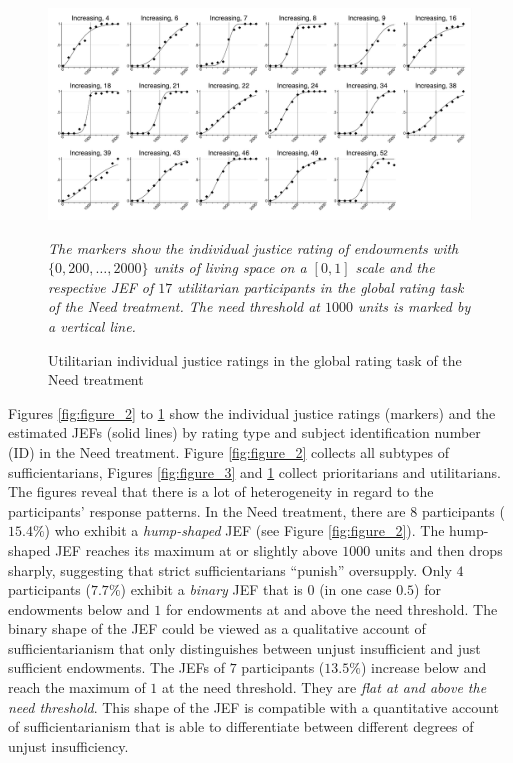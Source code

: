 \documentclass[12pt]{scrartcl}
\begin{document}
\begin{figure}[h!t!]
   \centering
   \includegraphics[width=\linewidth]{figures/figure_4.pdf}
   \begin{minipage}{\linewidth}
      \footnotesize
      \textit{The markers show the individual justice rating of endowments with $\{0,200,\ldots,2000\}$ units of living space on a $[0,1]$ scale and the respective JEF of $17$ utilitarian participants in the global rating task of the Need treatment. The need threshold at $1000$ units is marked by a vertical line.}
   \end{minipage}
   \caption{Utilitarian individual justice ratings in the global rating task of the Need treatment}\label{fig:figure_4}
\end{figure}

Figures \ref{fig:figure_2} to \ref{fig:figure_4} show the individual justice ratings (markers) and the estimated JEFs (solid lines) by rating type and subject identification number (ID) in the Need treatment.
Figure \ref{fig:figure_2} collects all subtypes of sufficientarians, Figures \ref{fig:figure_3} and \ref{fig:figure_4} collect prioritarians and utilitarians.
The figures reveal that there is a lot of heterogeneity in regard to the participants' response patterns.
In the Need treatment, there are $8$ participants ($15.4\%$) who exhibit a \textit{hump-shaped} JEF (see Figure \ref{fig:figure_2}).
The hump-shaped JEF reaches its maximum at or slightly above $1000$ units and then drops sharply, suggesting that strict sufficientarians ``punish'' oversupply.
Only $4$ participants ($7.7\%$) exhibit a \textit{binary} JEF that is $0$ (in one case $0.5$) for endowments below and $1$ for endowments at and above the need threshold.
The binary shape of the JEF could be viewed as a qualitative account of sufficientarianism that only distinguishes between unjust insufficient and just sufficient endowments.
The JEFs of $7$ participants ($13.5\%$) increase below and reach the maximum of $1$ at the need threshold.
They are \textit{flat at and above the need threshold}.
This shape of the JEF is compatible with a quantitative account of sufficientarianism that is able to differentiate between different degrees of unjust insufficiency.
\end{document}
